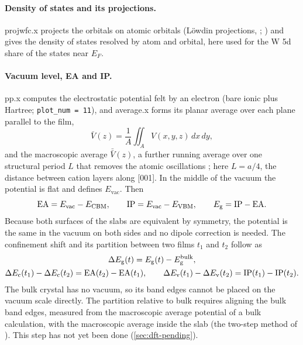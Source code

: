 \paragraph{Density of states and its projections.} projwfc.x projects the orbitals on atomic orbitals (L\"owdin
projections, \citealp{Lowdin1950}; \citealp[p.~10]{Giannozzi2009}) and gives the density of states resolved by atom and
orbital, here used for the W 5d share of the states near $E_F$.

\paragraph{Vacuum level, EA and IP.} pp.x computes the electrostatic potential felt by an electron (bare ionic plus
Hartree; \texttt{plot\_num = 11}), and average.x forms its planar average over each plane parallel to the film,
\begin{equation}
\bar V(z) = \frac{1}{A}\iint_A V(x,y,z)\,dx\,dy ,
\label{eq:dft-planar}
\end{equation}
and the macroscopic average $\bar{\bar V}(z)$, a further running average over one structural period $L$ that removes the
atomic oscillations \citep{Baldereschi1988}\citep[p.~10]{Giannozzi2009}; here $L = a/4$, the distance between cation
layers along [001]. In the middle of the vacuum the potential is flat and defines $E_{\mathrm{vac}}$. Then
\begin{equation}
\mathrm{EA} = E_{\mathrm{vac}} - E_{\mathrm{CBM}}, \qquad \mathrm{IP} = E_{\mathrm{vac}} - E_{\mathrm{VBM}}, \qquad
E_{\mathrm{g}} = \mathrm{IP} - \mathrm{EA} .
\label{eq:dft-eaip}
\end{equation}
Because both surfaces of the slabs are equivalent by symmetry, the potential is the same in the vacuum on both sides and
no dipole correction \citep{Neugebauer1992} is needed. The confinement shift and its partition between two films $t_1$
and $t_2$ follow as
\begin{equation}
\begin{gathered}
\Delta E_{\mathrm{g}}(t) = E_{\mathrm{g}}(t) - E_{\mathrm{g}}^{\mathrm{bulk}}, \\
\Delta E_{\mathrm{c}}(t_1) - \Delta E_{\mathrm{c}}(t_2) = \mathrm{EA}(t_2) - \mathrm{EA}(t_1), \qquad
\Delta E_{\mathrm{v}}(t_1) - \Delta E_{\mathrm{v}}(t_2) = \mathrm{IP}(t_1) - \mathrm{IP}(t_2) .
\end{gathered}
\label{eq:dft-partition}
\end{equation}
The bulk crystal has no vacuum, so its band edges cannot be placed on the vacuum scale directly. The partition relative
to bulk requires aligning the bulk band edges, measured from the macroscopic average potential of a bulk calculation,
with the macroscopic average inside the slab (the two-step method of \citealp{VandeWalle1987,Baldereschi1988}). This
step has not yet been done (\cref{sec:dft-pending}).

